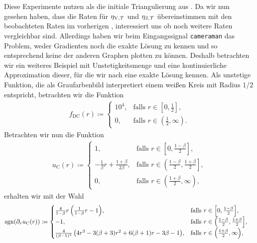 Diese Experimente nutzen als die initiale Triangulierung aus
.
Da wir nun gesehen haben, dass die Raten für $\eta_{\textup{V}, \mathcal{T}}$ und $\eta_{\textup{J}, \mathcal{T}}$ übereinstimmen
mit den beobachteten Raten im vorherigen
, interessiert uns ob noch weitere
Raten vergleichbar sind. 
Allerdings haben wir beim Eingangssignal \texttt{cameraman} das Problem,
weder Gradienten noch die exakte Lösung zu kennen und so entsprechend keine
der anderen Graphen plotten zu können.
Deshalb betrachten wir ein weiteres Beispiel mit Unstetigkeitsmenge und 
eine kontinuierliche Approximation dieser, für die wir nach
 eine exakte Lösung kennen.
Als unstetige Funktion, die als Graufarbenbild interpretiert einem 
weißen Kreis mit Radius $1/2$ entspricht, betrachten wir die Funktion
\begin{align*}
  f_\textrm{DC}(r)\coloneqq 
  \begin{cases}
    10^4, 
    & \text{falls } r\in \left[0,\frac{1}{2}\right]\!,\\
    0, 
    & \text{falls } r\in \left(\frac{1}{2},\infty\right)\!.
  \end{cases}
\end{align*}
Betrachten wir nun die Funktion
\begin{align*}
  u_\textrm{C}(r)\coloneqq 
  \begin{cases}
    1, 
    & \text{falls } r\in \left[0,\frac{1-\beta}{2}\right]\!,\\
    -\frac{1}{\beta}r + \frac{1+\beta}{2\beta}, 
    & \text{falls } r\in \left(\frac{1-\beta}{2}, \frac{1+\beta}{2}\right]\!,\\
    0,
    & \text{falls } r\in \left(\frac{1+\beta}{2},\infty\right)\!,
  \end{cases}
\end{align*}
erhalten wir mit der Wahl
\begin{align*}
  \operatorname{sgn}(\partial_r u_\textrm{C}(r)) 
  &\coloneqq 
  \begin{cases}
    \frac{4}{1-\beta}r\left(\frac{1}{1-\beta}r -1\right)\!, 
    & \text{falls } r\in \left[0,\frac{1-\beta}{2}\right]\!,\\
    -1,
    & \text{falls } r\in \left(\frac{1-\beta}{2}, \frac{1+\beta}{2}\right]\!,\\
    \frac{4}{(\beta-1)^3}
    \left( 4r^3-3(\beta+3)r^2 +6(\beta+1)r-3\beta-1\right)\!, 
    & \text{falls } r\in \left(\frac{1+\beta}{2},\infty\right)\!,
  \end{cases}
\end{align*}

